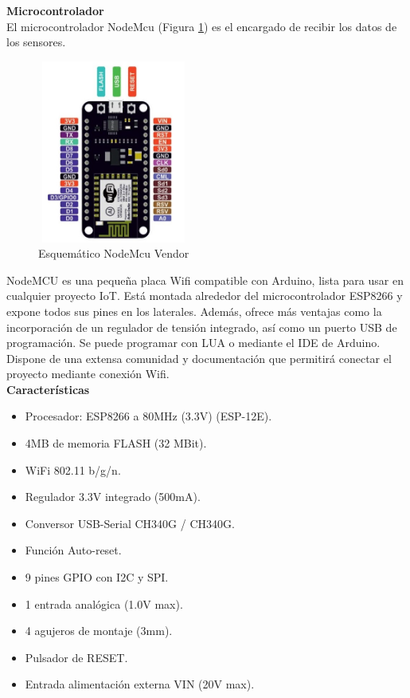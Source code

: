     \textbf{Microcontrolador}\\
    El microcontrolador NodeMcu (Figura \ref{imag:nodemcu}) es el encargado de recibir los datos de los sensores.\\

    \begin{figure}[h]
        \centering
        \includegraphics[width=5cm, height=6cm]{imagenes/nodemcu0.jpg}
        \caption{Esquemático NodeMcu Vendor}
        \label{imag:nodemcu}
    \end{figure}
    
    
    NodeMCU es una pequeña placa Wifi compatible con Arduino, lista para usar en cualquier proyecto IoT. Está montada alrededor del microcontrolador ESP8266 y expone todos sus pines en los laterales. Además, ofrece más ventajas como la incorporación de un regulador de tensión integrado, así como un puerto USB de programación. Se puede programar con LUA o mediante el IDE de Arduino.\\
    Dispone de una extensa comunidad y documentación que permitirá conectar el proyecto mediante conexión Wifi.\\

    \textbf{Características}
    \begin{itemize}
        \item Procesador: ESP8266 a 80MHz (3.3V) (ESP-12E).
        \item 4MB de memoria FLASH (32 MBit).
        \item WiFi 802.11 b/g/n.
        \item Regulador 3.3V integrado (500mA).
        \item Conversor USB-Serial CH340G / CH340G.
        \item Función Auto-reset.
        \item 9 pines GPIO con I2C y SPI.
        \item 1 entrada analógica (1.0V max).
        \item 4 agujeros de montaje (3mm).
        \item Pulsador de RESET.
        \item Entrada alimentación externa VIN (20V max).\\
    \end{itemize}

